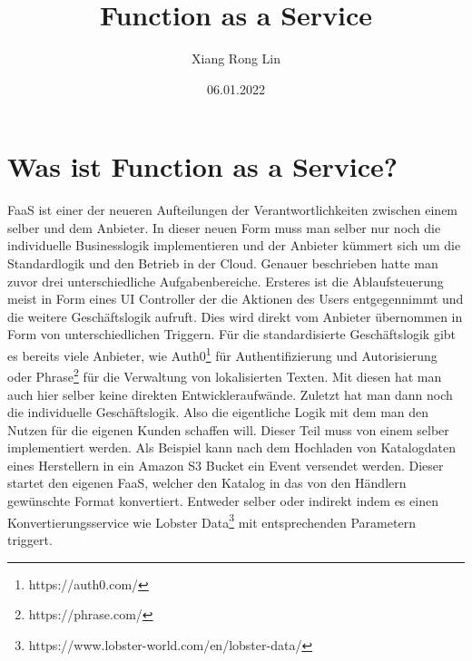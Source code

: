 \documentclass[12pt, a4paper]{article}
\title{Function as a Service}
\author{Xiang Rong Lin}
\date{06.01.2022}
\begin{document}
\maketitle



\newpage
\tableofcontents

\newpage

\section{Was ist Function as a Service?}
\ac{FaaS} ist einer der neueren Aufteilungen der Verantwortlichkeiten zwischen einem selber und dem Anbieter.
In dieser neuen Form muss man selber nur noch die individuelle Businesslogik implementieren und der Anbieter kümmert sich um die Standardlogik und den Betrieb in der Cloud.
Genauer beschrieben hatte man zuvor drei unterschiedliche Aufgabenbereiche\cite{serverless2017roewekamp}.
\newline
Ersteres ist die Ablaufsteuerung meist in Form eines UI Controller der die Aktionen des Users entgegennimmt und die weitere Geschäftslogik aufruft.
Dies wird direkt vom Anbieter übernommen in Form von unterschiedlichen Triggern.
\newline
Für die standardisierte Geschäftslogik gibt es bereits viele Anbieter, wie Auth0\footnote{https://auth0.com/} für Authentifizierung und Autorisierung oder Phrase\footnote{https://phrase.com/} für die Verwaltung von lokalisierten Texten.
Mit diesen hat man auch hier selber keine direkten Entwickleraufwände.
\newline
Zuletzt hat man dann noch die individuelle Geschäftslogik.
Also die eigentliche Logik mit dem man den Nutzen für die eigenen Kunden schaffen will.
Dieser Teil muss von einem selber implementiert werden.
Als Beispiel kann nach dem Hochladen von Katalogdaten eines Herstellern in ein Amazon S3 Bucket ein Event versendet werden.
Dieser startet den eigenen \ac{FaaS}, welcher den Katalog in das von den Händlern gewünschte Format konvertiert.
Entweder selber oder indirekt indem es einen Konvertierungsservice wie Lobster Data\footnote{https://www.lobster-world.com/en/lobster-data/} mit entsprechenden Parametern triggert.
\end{document}
